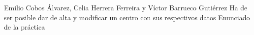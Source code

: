 {Emilio Cobos Álvarez, Celia Herrera Ferreira y Víctor Barrueco Gutiérrez}
{Ha de ser posible dar de alta y modificar un centro con sus respectivos datos}
{}
{Enunciado de la práctica}

